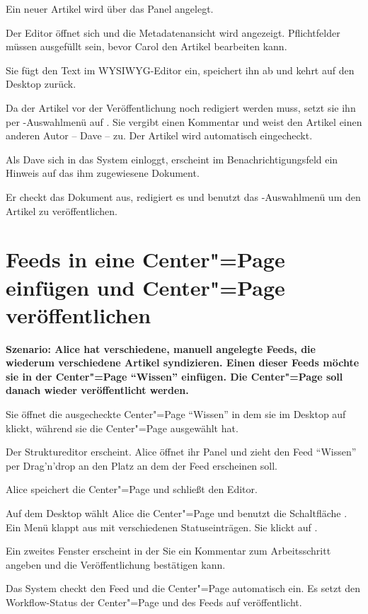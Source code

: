 \begin{compactenum}
 \item Ein neuer Artikel wird über das  Panel angelegt. 
 \item Der Editor öffnet sich und die Metadatenansicht wird angezeigt. 
 Pflichtfelder müssen ausgefüllt sein, bevor Carol den Artikel 
 bearbeiten kann.
 \item Sie fügt den Text im WYSIWYG-Editor ein, speichert ihn ab und 
 kehrt auf den Desktop zurück.
 \item Da der Artikel vor der Veröffentlichung noch redigiert werden 
 muss, setzt sie ihn per -Auswahlmenü auf 
 . Sie vergibt einen Kommentar und weist den 
 Artikel einen anderen Autor -- Dave -- zu. Der Artikel wird automatisch eingecheckt.
 \item Als Dave sich in das System einloggt, erscheint im 
 Benachrichtigungsfeld ein Hinweis auf das ihm zugewiesene Dokument.
 \item Er checkt das Dokument aus, redigiert es und benutzt das 
 -Auswahlmenü um den Artikel zu veröffentlichen.
\end{compactenum}


\section{Feeds in eine Center"=Page einfügen und Center"=Page veröffentlichen}

\textbf{Szenario: Alice hat verschiedene, manuell angelegte Feeds, die 
wiederum verschiedene Artikel syndizieren. Einen dieser Feeds möchte 
sie in der Center"=Page "`Wissen"' einfügen. Die Center"=Page soll danach 
wieder veröffentlicht werden.
}

\begin{compactenum}
 \item Sie öffnet die ausgecheckte Center"=Page "`Wissen"' in dem sie im 
 Desktop auf  klickt, während sie die Center"=Page 
 ausgewählt hat.

 \item Der Struktureditor erscheint. Alice öffnet ihr Panel 
  und zieht den Feed "`Wissen"' per 
 Drag'n'drop an den 
 Platz an dem der Feed erscheinen soll.

 \item Alice speichert die Center"=Page und schließt den Editor.
 \item Auf dem Desktop wählt Alice die Center"=Page und benutzt die 
 Schaltfläche . Ein Menü klappt aus mit 
 verschiedenen Statuseinträgen. Sie klickt auf 
 . 
 \item Ein zweites Fenster erscheint in der Sie ein Kommentar zum
 Arbeitsschritt angeben und die Veröffentlichung bestätigen kann. 
 
 \item Das System checkt den Feed und die Center"=Page automatisch ein. 
 Es setzt den Workflow-Status der Center"=Page und des Feeds auf veröffentlicht.

\end{compactenum}

